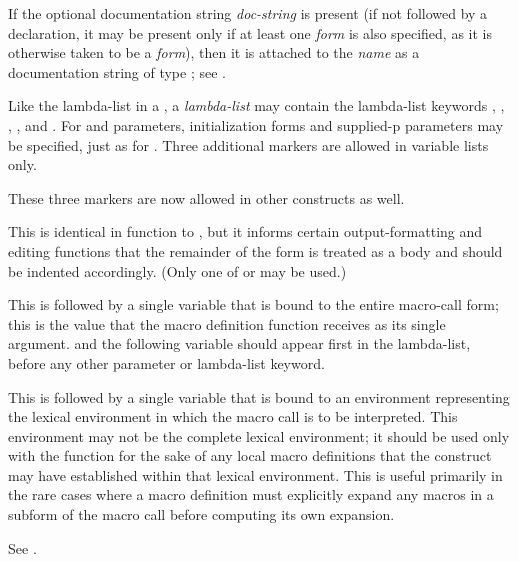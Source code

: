 \begin{defmac}
If the optional documentation string {\it doc-string} is present (if not
followed by a declaration, it may be
present only if at least one {\it form} is also specified, as it is
otherwise taken to be a {\it form}), then it is attached to the {\it name}
as a documentation string of type ; see .

\begin{obsolete}
Like the lambda-list in a , a  {\it lambda-list} may contain
the lambda-list keywords , , ,
, and .
For  and  parameters, initialization forms and
supplied-p parameters may be specified, just as for .
Three additional markers
are allowed in  variable lists only.
\end{obsolete}
\begin{new}
These three markers are now allowed in other constructs as well.
\end{new}
\begin{indentdesc}{6pc}
\item[\cd{\&body}]
This is identical in function to , but it informs certain
output-formatting and editing functions that the remainder of the form is
treated as a body and should be indented accordingly.
(Only one of  or  may be used.)

\item[\cd{\&whole}]
This is followed by a single variable that is bound to the
entire macro-call form; this is the value that the macro definition function
receives as its single argument.
 and the following variable should appear first in the lambda-list,
before any other parameter or lambda-list keyword.

\item[\cd{\&environment}]
This is followed by a single variable that is bound
to an environment representing the lexical environment in which the
macro call is to be interpreted.   This environment may not be the
complete lexical environment; it should be used only with
the function  for the sake of any local
macro definitions that the  construct may have
established within that lexical environment.  This is useful primarily
in the rare cases where a macro definition must explicitly expand any macros
in a subform of the macro call before computing its own expansion.
\end{indentdesc}
See .


\end{defmac}
